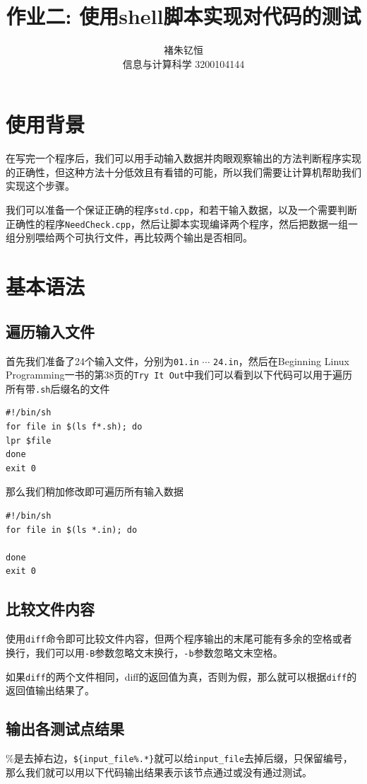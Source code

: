 \documentclass{article}
\title{作业二: 使用shell脚本实现对代码的测试}
\author{褚朱钇恒 \\ 信息与计算科学 3200104144}
\begin{document}
\maketitle

\section{使用背景}
    在写完一个程序后，我们可以用手动输入数据并肉眼观察输出的方法判断程序实现的正确性，但这种方法十分低效且有看错的可能，所以我们需要让计算机帮助我们实现这个步骤。

    我们可以准备一个保证正确的程序\verb|std.cpp|，和若干输入数据，以及一个需要判断正确性的程序\verb|NeedCheck.cpp|，然后让脚本实现编译两个程序，然后把数据一组一组分别喂给两个可执行文件，再比较两个输出是否相同。

\section{基本语法}
    \subsection{遍历输入文件}
        首先我们准备了24个输入文件，分别为\verb|01.in| $\cdots$ \verb|24.in|，然后在Beginning Linux Programming一书的第38页的\verb|Try It Out|中我们可以看到以下代码可以用于遍历所有带\verb|.sh|后缀名的文件
        \begin{verbatim}
#!/bin/sh
for file in $(ls f*.sh); do
lpr $file
done
exit 0
        \end{verbatim}

        那么我们稍加修改即可遍历所有输入数据
        \begin{verbatim}
#!/bin/sh
for file in $(ls *.in); do

done
exit 0
        \end{verbatim} 
    \subsection{比较文件内容}
        使用\verb|diff|命令即可比较文件内容，但两个程序输出的末尾可能有多余的空格或者换行，我们可以用\verb|-B|参数忽略文末换行，\verb|-b|参数忽略文末空格。

        如果\verb|diff|的两个文件相同，diff的返回值为真，否则为假，那么就可以根据\verb|diff|的返回值输出结果了。
    
    \subsection{输出各测试点结果}
        $\%$是去掉右边，\verb!${input_file%.*}!就可以给\verb|input_file|去掉后缀，只保留编号，那么我们就可以用以下代码输出结果表示该节点通过或没有通过测试。
        
\end{document}
